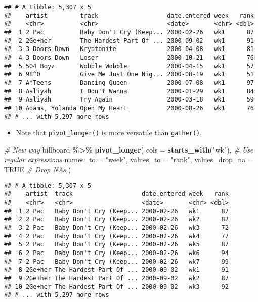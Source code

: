 \documentclass[
]{book}
\newenvironment{Shaded}{\begin{snugshade}}{\end{snugshade}}
\newcommand{\CommentTok}[1]{\textcolor[rgb]{0.56,0.35,0.01}{\textit{#1}}}
\newcommand{\DataTypeTok}[1]{\textcolor[rgb]{0.13,0.29,0.53}{#1}}
\newcommand{\KeywordTok}[1]{\textcolor[rgb]{0.13,0.29,0.53}{\textbf{#1}}}
\newcommand{\NormalTok}[1]{#1}
\newcommand{\OperatorTok}[1]{\textcolor[rgb]{0.81,0.36,0.00}{\textbf{#1}}}
\newcommand{\OtherTok}[1]{\textcolor[rgb]{0.56,0.35,0.01}{#1}}
\newcommand{\StringTok}[1]{\textcolor[rgb]{0.31,0.60,0.02}{#1}}
\providecommand{\tightlist}{%
  \setlength{\itemsep}{0pt}\setlength{\parskip}{0pt}}
\begin{document}
\begin{verbatim}
## # A tibble: 5,307 x 5
##    artist         track                   date.entered week   rank
##    <chr>          <chr>                   <date>       <chr> <dbl>
##  1 2 Pac          Baby Don't Cry (Keep... 2000-02-26   wk1      87
##  2 2Ge+her        The Hardest Part Of ... 2000-09-02   wk1      91
##  3 3 Doors Down   Kryptonite              2000-04-08   wk1      81
##  4 3 Doors Down   Loser                   2000-10-21   wk1      76
##  5 504 Boyz       Wobble Wobble           2000-04-15   wk1      57
##  6 98^0           Give Me Just One Nig... 2000-08-19   wk1      51
##  7 A*Teens        Dancing Queen           2000-07-08   wk1      97
##  8 Aaliyah        I Don't Wanna           2000-01-29   wk1      84
##  9 Aaliyah        Try Again               2000-03-18   wk1      59
## 10 Adams, Yolanda Open My Heart           2000-08-26   wk1      76
## # ... with 5,297 more rows
\end{verbatim}

\begin{itemize}
\tightlist
\item
  Note that \texttt{pivot\_longer()} is more versatile than \texttt{gather()}.
\end{itemize}

\begin{Shaded}
\begin{Highlighting}[]
\CommentTok{\# New way}
\NormalTok{billboard }\OperatorTok{\%\textgreater{}\%}
\StringTok{  }\KeywordTok{pivot\_longer}\NormalTok{(}
    \DataTypeTok{cols =} \KeywordTok{starts\_with}\NormalTok{(}\StringTok{"wk"}\NormalTok{), }\CommentTok{\# Use regular expressions}
    \DataTypeTok{names\_to =} \StringTok{"week"}\NormalTok{,}
    \DataTypeTok{values\_to =} \StringTok{"rank"}\NormalTok{,}
    \DataTypeTok{values\_drop\_na =} \OtherTok{TRUE} \CommentTok{\# Drop NAs}
\NormalTok{  )}
\end{Highlighting}
\end{Shaded}

\begin{verbatim}
## # A tibble: 5,307 x 5
##    artist  track                   date.entered week   rank
##    <chr>   <chr>                   <date>       <chr> <dbl>
##  1 2 Pac   Baby Don't Cry (Keep... 2000-02-26   wk1      87
##  2 2 Pac   Baby Don't Cry (Keep... 2000-02-26   wk2      82
##  3 2 Pac   Baby Don't Cry (Keep... 2000-02-26   wk3      72
##  4 2 Pac   Baby Don't Cry (Keep... 2000-02-26   wk4      77
##  5 2 Pac   Baby Don't Cry (Keep... 2000-02-26   wk5      87
##  6 2 Pac   Baby Don't Cry (Keep... 2000-02-26   wk6      94
##  7 2 Pac   Baby Don't Cry (Keep... 2000-02-26   wk7      99
##  8 2Ge+her The Hardest Part Of ... 2000-09-02   wk1      91
##  9 2Ge+her The Hardest Part Of ... 2000-09-02   wk2      87
## 10 2Ge+her The Hardest Part Of ... 2000-09-02   wk3      92
## # ... with 5,297 more rows
\end{verbatim}
\end{document}
